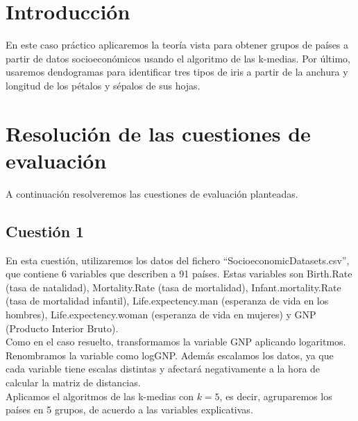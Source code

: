 \documentclass[12pt,a4paper,twoside,openright,titlepage,final]{article}
\author{José Ignacio Escribano}
\title{}
\begin{document}
\setcounter{page}{1}


\listoffigures
\thispagestyle{empty}
\newpage

\tableofcontents
\thispagestyle{empty}
\newpage


\setcounter{page}{1}

\section{Introducción}

En este caso práctico aplicaremos la teoría vista para obtener grupos de países a partir de datos socioeconómicos usando el algoritmo de las k-medias. Por último, usaremos dendogramas para identificar tres tipos de iris a partir de la anchura y longitud de los pétalos y sépalos de sus hojas.

\section{Resolución de las cuestiones de evaluación}

A continuación resolveremos las cuestiones de evaluación planteadas.

\subsection{Cuestión 1}

En esta cuestión, utilizaremos los datos del fichero ``SocioeconomicDatasets.csv'', que contiene 6 variables que describen a 91 países. Estas variables son Birth.Rate (tasa de natalidad), Mortality.Rate (tasa de mortalidad), Infant.mortality.Rate (tasa de mortalidad infantil), Life.expectency.man (esperanza de vida en los hombres), Life.expectency.woman (esperanza de vida en mujeres) y GNP (Producto Interior Bruto).\\

Como en el caso resuelto, transformamos la variable GNP aplicando logaritmos. Renombramos la variable como logGNP. Además escalamos los datos, ya que cada variable tiene escalas distintas y afectará negativamente a la hora de calcular la matriz de distancias.\\

Aplicamos el algoritmos de las k-medias con $k=5$, es decir, agruparemos los países en 5 grupos, de acuerdo a las variables explicativas.\\
\end{document}
